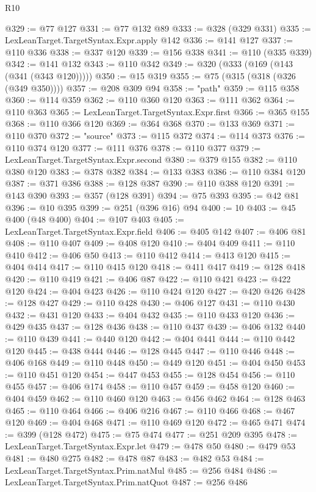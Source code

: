 \begin{lexlean}{R10}
\begin{coremodule}
@329 := @77 @127
@331 := @77 @132 @89
@333 := @328 (@329 @331)
@335 := LexLeanTarget.TargetSyntax.Expr.apply @142
@336 := @141 @127
@337 := @110 @336
@338 := @337 @120
@339 := @156 @338
@341 := @110 (@335 @339)
@342 := @141 @132
@343 := @110 @342
@349 := @320 (@333 (@169 (@143 (@341 (@343 @120)))))
@350 := @15 @319
@355 := @75 (@315 (@318 (@326 (@349 @350))))
@357 := @208 @309 @94
@358 := "path"
@359 := @115 @358
@360 := @114 @359
@362 := @110 @360 @120
@363 := @111 @362
@364 := @110 @363
@365 := LexLeanTarget.TargetSyntax.Expr.first
@366 := @365 @155
@368 := @110 @366 @120
@369 := @364 @368
@370 := @133 @369
@371 := @110 @370
@372 := "source"
@373 := @115 @372
@374 := @114 @373
@376 := @110 @374 @120
@377 := @111 @376
@378 := @110 @377
@379 := LexLeanTarget.TargetSyntax.Expr.second
@380 := @379 @155
@382 := @110 @380 @120
@383 := @378 @382
@384 := @133 @383
@386 := @110 @384 @120
@387 := @371 @386
@388 := @128 @387
@390 := @110 @388 @120
@391 := @143 @390
@393 := @357 (@128 @391)
@394 := @75 @393
@395 := @42 @81
@396 := @10 @395
@399 := @251 (@396 @16) @94
@400 := 10
@403 := @45 @400 (@48 @400)
@404 := @107 @403
@405 := LexLeanTarget.TargetSyntax.Expr.field
@406 := @405 @142
@407 := @406 @81
@408 := @110 @407
@409 := @408 @120
@410 := @404 @409
@411 := @110 @410
@412 := @406 @50
@413 := @110 @412
@414 := @413 @120
@415 := @404 @414
@417 := @110 @415 @120
@418 := @411 @417
@419 := @128 @418
@420 := @110 @419
@421 := @406 @87
@422 := @110 @421
@423 := @422 @120
@424 := @404 @423
@426 := @110 @424 @120
@427 := @420 @426
@428 := @128 @427
@429 := @110 @428
@430 := @406 @127
@431 := @110 @430
@432 := @431 @120
@433 := @404 @432
@435 := @110 @433 @120
@436 := @429 @435
@437 := @128 @436
@438 := @110 @437
@439 := @406 @132
@440 := @110 @439
@441 := @440 @120
@442 := @404 @441
@444 := @110 @442 @120
@445 := @438 @444
@446 := @128 @445
@447 := @110 @446
@448 := @406 @168
@449 := @110 @448
@450 := @449 @120
@451 := @404 @450
@453 := @110 @451 @120
@454 := @447 @453
@455 := @128 @454
@456 := @110 @455
@457 := @406 @174
@458 := @110 @457
@459 := @458 @120
@460 := @404 @459
@462 := @110 @460 @120
@463 := @456 @462
@464 := @128 @463
@465 := @110 @464
@466 := @406 @216
@467 := @110 @466
@468 := @467 @120
@469 := @404 @468
@471 := @110 @469 @120
@472 := @465 @471
@474 := @399 (@128 @472)
@475 := @75 @474
@477 := @251 @209 @395
@478 := LexLeanTarget.TargetSyntax.Expr.let
@479 := @478 @50
@480 := @479 @53
@481 := @480 @275
@482 := @478 @87
@483 := @482 @53
@484 := LexLeanTarget.TargetSyntax.Prim.natMul
@485 := @256 @484
@486 := LexLeanTarget.TargetSyntax.Prim.natQuot
@487 := @256 @486

\end{coremodule}
\end{lexlean}
